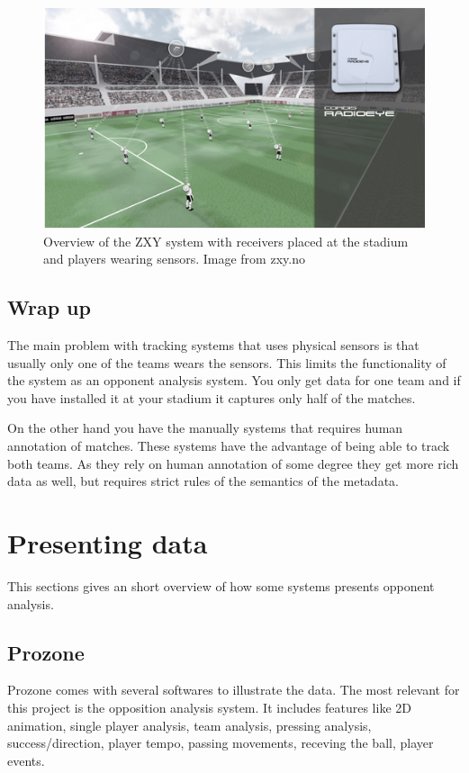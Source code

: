 \begin{figure}[ht!]
\centering
\includegraphics[width=1\textwidth]{images/general/zxyoverview.png}
\caption{Overview of the ZXY system with receivers placed at the stadium and players wearing sensors. Image from zxy.no}
\label{fig:zxycam}
\end{figure}

\subsection{Wrap up}
The main problem with tracking systems that uses physical sensors is that usually only one of the teams wears the sensors. This limits the functionality of the system as an opponent analysis system. You only get data for one team and if you have installed it at your stadium it captures only half of the matches. 

On the other hand you have the manually systems that requires human annotation of matches. These systems have the advantage of being able to track both teams. As they rely on human annotation of some degree they get more rich data as well, but requires strict rules of the semantics of the metadata. 

\section{Presenting data}

This sections gives an short overview of how some systems presents opponent analysis.

\subsection{Prozone}

Prozone comes with several softwares to illustrate the data. The most relevant for this project is the opposition analysis system. It includes features like 2D animation, single player analysis, team analysis, pressing analysis, success/direction, player tempo, passing movements, receving the ball, player events.

